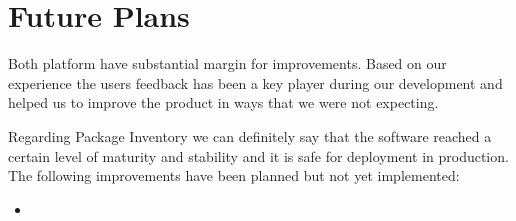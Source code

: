 \section{Future Plans}

Both platform have substantial margin for improvements. Based on our
experience the users feedback has been a key player during our development
and helped us to improve the product in ways that we were not expecting.

Regarding Package Inventory we can definitely say that the software
reached a certain level of maturity and stability and it is safe for
deployment in production. The following improvements have been planned but
not yet implemented:

\begin{itemize}

  \item 

\end{itemize}
